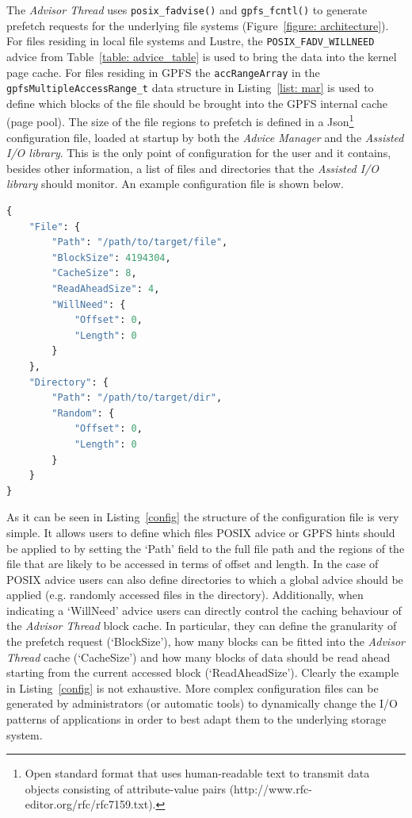 The \textit{Advisor Thread} uses \texttt{posix\_fadvise()} and \texttt{gpfs\_fcntl()} to generate prefetch requests for the underlying file systems (Figure~\ref{figure: architecture}). For files residing in local file systems and Lustre, the 
\texttt{POSIX\_FADV\_WILLNEED} advice from Table~\ref{table: advice_table} is used to bring the data into the kernel page cache. For files residing in GPFS the \texttt{accRangeArray} in the \texttt{gpfsMultipleAccessRange\_t} data structure in Listing~\ref{list: mar} 
is used to define which blocks of the file should be brought into the GPFS internal cache (page pool). The size of the file regions to prefetch is defined in a Json\footnote{Open standard format that uses human-readable text to transmit data objects consisting 
of attribute-value pairs (http://www.rfc-editor.org/rfc/rfc7159.txt).} configuration file, loaded at startup by both the \textit{Advice Manager} and the \textit{Assisted I/O library}. This is the only point of configuration for the user and it contains, besides 
other information, a list of files and directories that the \textit{Assisted I/O library} should monitor. An example configuration file is shown below. 

\begin{lstlisting}[language=python, caption=Example of Json Configuration File, label={config}]
{
    "File": {
        "Path": "/path/to/target/file",
        "BlockSize": 4194304,
        "CacheSize": 8,
        "ReadAheadSize": 4,
        "WillNeed": {
            "Offset": 0,
            "Length": 0
        }
    },
    "Directory": {
        "Path": "/path/to/target/dir",
        "Random": {
            "Offset": 0,
            "Length": 0
        }
    }
}
\end{lstlisting}

As it can be seen in Listing~\ref{config} the structure of the configuration file is very simple. It allows users to define which files POSIX advice or GPFS hints should be applied to by setting the `Path' field to the full file path and the regions of the file 
that are likely to be accessed in terms of offset and length. In the case of POSIX advice users can also define directories to which a global advice should be applied (e.g. randomly accessed files in the directory). Additionally, when indicating a `WillNeed' 
advice users can directly control the caching behaviour of the \textit{Advisor Thread} block cache. In particular, they can define the granularity of the prefetch request (`BlockSize'), how many blocks can be fitted into the \textit{Advisor Thread} cache 
(`CacheSize') and how many blocks of data should be read ahead starting from the current accessed block (`ReadAheadSize'). Clearly the example in Listing~\ref{config} is not exhaustive. More complex configuration files can be generated by administrators 
(or automatic tools) to dynamically change the I/O patterns of applications in order to best adapt them to the underlying storage system.

